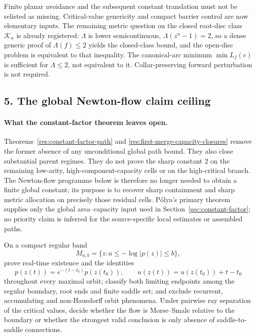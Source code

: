 Finite planar avoidance and the subsequent constant translation must not be
relisted as missing.  Critical-value genericity and compact barrier control are
now elementary inputs.  The remaining metric question on the closed root-disc
class $\mathcal K_n$ is already registered: $\Lambda$ is lower semicontinuous,
$\Lambda(z^n-1)=2$, so a dense generic proof of $\Lambda(f)\le 2$ yields the
closed-class bound, and the open-disc problem is equivalent to that inequality.
The canonical-arc minimum $\min L_f(c)$ is sufficient for $\Lambda\le 2$, not
equivalent to it.  Collar-preserving forward perturbation is not required.

\subsection*{5. The global Newton-flow claim ceiling}

\paragraph{What the constant-factor theorem leaves open.}
Theorems~\ref{res:constant-factor-path} and
\ref{res:first-merge-capacity-closures} remove the former absence of any
unconditional global path bound.  They also close substantial parent regimes.
They do not prove the sharp constant $2$ on the remaining low-arity,
high-component-capacity cells or on the high-critical branch.  The Newton-flow
programme below is therefore no longer needed to obtain a finite global
constant; its purpose is to recover sharp containment and sharp metric
allocation on precisely those residual cells.  P\'olya's primary theorem
supplies only the global area--capacity input used in
Section~\ref{sec:constant-factor}; no priority claim is inferred for the
source-specific local estimates or assembled paths.

\begin{problem}\label{prob:globalflow1041}
On a compact regular band
\[
 M_{a,b}=\{z:a\le-\log|p(z)|\le b\},
\]
prove real-time existence and the identities
\[
 p(z(t))=e^{-(t-t_0)}p(z(t_0)),\qquad
 u(z(t))=u(z(t_0))+t-t_0
\]
throughout every maximal orbit; classify both limiting endpoints among the
regular boundary, root ends and finite saddle set; and exclude recurrent,
accumulating and non-Hausdorff orbit phenomena.  Under pairwise ray separation
of the critical values, decide whether the flow is Morse--Smale relative to the
boundary or whether the strongest valid conclusion is only absence of
saddle-to-saddle connections.
\end{problem}

